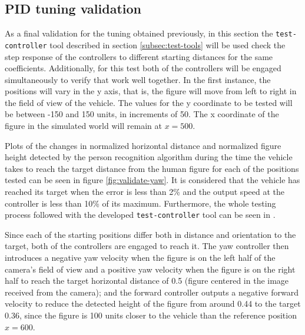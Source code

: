 \subsection{PID tuning validation}

As a final validation for the tuning obtained previously, in this section the \texttt{test-controller} tool described in section \ref{subsec:test-tools} will be used check the step response of the controllers to different starting distances for the same coefficients.
Additionally, for this test both of the controllers will be engaged simultaneously to verify that work well together.
In the first instance, the positions will vary in the y axis, that is, the figure will move from left to right in the field of view of the vehicle.
The values for the y coordinate to be tested will be between -150 and 150 units, in increments of 50.
The x coordinate of the figure in the simulated world will remain at $x=500$.

Plots of the changes in normalized horizontal distance and normalized figure height detected by the person recognition algorithm during the time the vehicle takes to reach the target distance from the human figure for each of the positions tested can be seen in figure \ref{fig:validate-yaw}.
It is considered that the vehicle has reached its target when the error is less than 2\% and the output speed at the controller is less than 10\% of its maximum.
Furthermore, the whole testing process followed with the developed \texttt{test-controller} tool can be seen in .

Since each of the starting positions differ both in distance and orientation to the target, both of the controllers are engaged to reach it.
The yaw controller then introduces a negative yaw velocity when the figure is on the left half of the camera's field of view and a positive yaw velocity when the figure is on the right half to reach the target horizontal distance of 0.5 (figure centered in the image received from the camera);
and the forward controller outputs a negative forward velocity to reduce the detected height of the figure from around 0.44 to the target 0.36, since the figure is 100 units closer to the vehicle than the reference position $x=600$.

